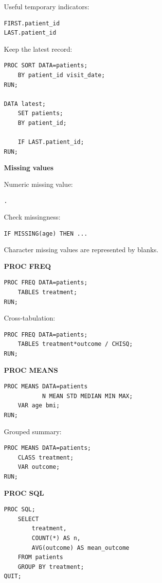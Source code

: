 \documentclass[11pt,letterpaper]{article}
\begin{document}
Useful temporary indicators:

\begin{lstlisting}
FIRST.patient_id
LAST.patient_id
\end{lstlisting}

Keep the latest record:

\begin{lstlisting}
PROC SORT DATA=patients;
    BY patient_id visit_date;
RUN;

DATA latest;
    SET patients;
    BY patient_id;

    IF LAST.patient_id;
RUN;
\end{lstlisting}

\textbf{Missing values}

Numeric missing value:

\begin{lstlisting}
.
\end{lstlisting}

Check missingness:

\begin{lstlisting}
IF MISSING(age) THEN ...
\end{lstlisting}

Character missing values are represented by blanks.

\textbf{PROC FREQ}

\begin{lstlisting}
PROC FREQ DATA=patients;
    TABLES treatment;
RUN;
\end{lstlisting}

Cross-tabulation:

\begin{lstlisting}
PROC FREQ DATA=patients;
    TABLES treatment*outcome / CHISQ;
RUN;
\end{lstlisting}

\textbf{PROC MEANS}

\begin{lstlisting}
PROC MEANS DATA=patients
           N MEAN STD MEDIAN MIN MAX;
    VAR age bmi;
RUN;
\end{lstlisting}

Grouped summary:

\begin{lstlisting}
PROC MEANS DATA=patients;
    CLASS treatment;
    VAR outcome;
RUN;
\end{lstlisting}

\textbf{PROC SQL}

\begin{lstlisting}
PROC SQL;
    SELECT
        treatment,
        COUNT(*) AS n,
        AVG(outcome) AS mean_outcome
    FROM patients
    GROUP BY treatment;
QUIT;
\end{lstlisting}
\end{document}
